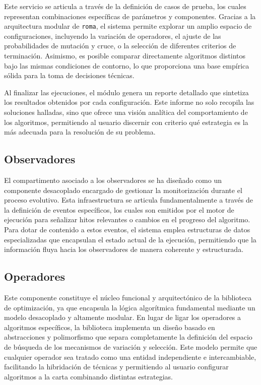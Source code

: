 \documentclass[12pt,a4paper,twoside,openright]{book}
\begin{document}
        Este servicio se articula a través de la definición de casos de prueba, los cuales representan combinaciones específicas de parámetros y componentes. Gracias a la arquitectura modular de \texttt{roma}, el sistema permite explorar un amplio espacio de configuraciones, incluyendo la variación de operadores, el ajuste de las probabilidades de mutación y cruce, o la selección de diferentes criterios de terminación. Asimismo, es posible comparar directamente algoritmos distintos bajo las mismas condiciones de contorno, lo que proporciona una base empírica sólida para la toma de decisiones técnicas.

        Al finalizar las ejecuciones, el módulo genera un reporte detallado que sintetiza los resultados obtenidos por cada configuración. Este informe no solo recopila las soluciones halladas, sino que ofrece una visión analítica del comportamiento de los algoritmos, permitiendo al usuario discernir con criterio qué estrategia es la más adecuada para la resolución de su problema.

    \subsection{Observadores}

        El compartimento asociado a los observadores se ha diseñado como un componente desacoplado encargado de gestionar la monitorización durante el proceso evolutivo. Esta infraestructura se articula fundamentalmente a través de la definición de eventos específicos, los cuales son emitidos por el motor de ejecución para señalizar hitos relevantes o cambios en el progreso del algoritmo. Para dotar de contenido a estos eventos, el sistema emplea estructuras de datos especializadas que encapsulan el estado actual de la ejecución, permitiendo que la información fluya hacia los observadores de manera coherente y estructurada.

    \subsection{Operadores}
        Este componente constituye el núcleo funcional y arquitectónico de la biblioteca de optimización, ya que encapsula la lógica algorítmica fundamental mediante un modelo desacoplado y altamente modular. En lugar de ligar los operadores a algoritmos específicos, la biblioteca implementa un diseño basado en abstracciones y polimorfismo que separa completamente la definición del espacio de búsqueda de los mecanismos de variación y selección. Este modelo permite que cualquier operador sea tratado como una entidad independiente e intercambiable, facilitando la hibridación de técnicas y permitiendo al usuario configurar algoritmos a la carta combinando distintas estrategias.
\end{document}
